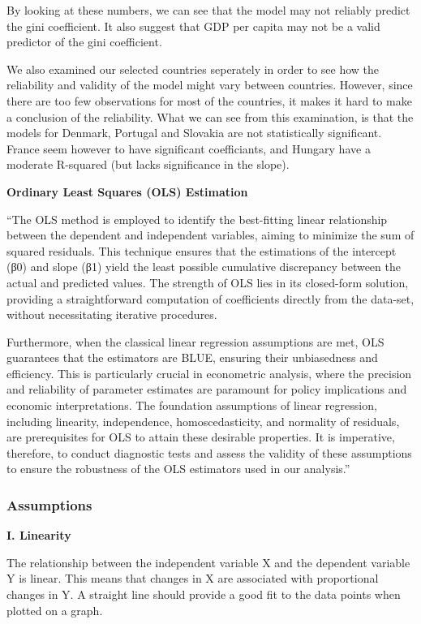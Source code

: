 \documentclass[
  a4paper,
  DIV=11,
  numbers=noendperiod]{scrartcl}
\begin{document}
By looking at these numbers, we can see that the model may not reliably
predict the gini coefficient. It also suggest that GDP per capita may
not be a valid predictor of the gini coefficient.

We also examined our selected countries seperately in order to see how
the reliability and validity of the model might vary between countries.
However, since there are too few observations for most of the countries,
it makes it hard to make a conclusion of the reliability. What we can
see from this examination, is that the models for Denmark, Portugal and
Slovakia are not statistically significant. France seem however to have
significant coefficiants, and Hungary have a moderate R-squared (but
lacks significance in the slope).

\textbf{Ordinary Least Squares (OLS) Estimation}

``The OLS method is employed to identify the best-fitting linear
relationship between the dependent and independent variables, aiming to
minimize the sum of squared residuals. This technique ensures that the
estimations of the intercept (β0) and slope (β1) yield the least
possible cumulative discrepancy between the actual and predicted values.
The strength of OLS lies in its closed-form solution, providing a
straightforward computation of coefficients directly from the data-set,
without necessitating iterative procedures.

Furthermore, when the classical linear regression assumptions are met,
OLS guarantees that the estimators are BLUE, ensuring their unbiasedness
and efficiency. This is particularly crucial in econometric analysis,
where the precision and reliability of parameter estimates are paramount
for policy implications and economic interpretations. The foundation
assumptions of linear regression, including linearity, independence,
homoscedasticity, and normality of residuals, are prerequisites for OLS
to attain these desirable properties. It is imperative, therefore, to
conduct diagnostic tests and assess the validity of these assumptions to
ensure the robustness of the OLS estimators used in our analysis.''

\hypertarget{assumptions}{%
\subsubsection{\texorpdfstring{\textbf{Assumptions}}{Assumptions}}\label{assumptions}}

\textbf{I. Linearity}

The relationship between the independent variable X and the dependent
variable Y is linear. This means that changes in X are associated with
proportional changes in Y. A straight line should provide a good fit to
the data points when plotted on a graph.
\end{document}
